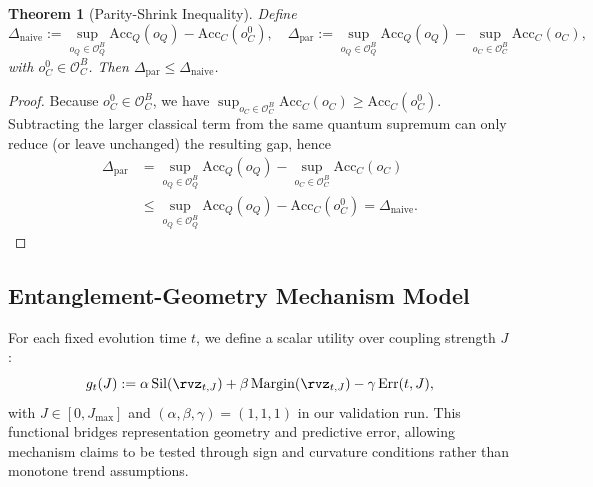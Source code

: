 \documentclass{article} %
\newtheorem{theorem}{Theorem}[section]
\begin{document}
\begin{theorem}[Parity-Shrink Inequality]
\label{thm:parity_shrink}
Define
\begin{equation}
\Delta_{\mathrm{naive}}:=\sup_{o_Q\in\mathcal{O}_Q^B} \mathrm{Acc}_Q(o_Q)-\mathrm{Acc}_C(o_C^0),\quad
\Delta_{\mathrm{par}}:=\sup_{o_Q\in\mathcal{O}_Q^B} \mathrm{Acc}_Q(o_Q)-\sup_{o_C\in\mathcal{O}_C^B}\mathrm{Acc}_C(o_C),
\label{eq:delta_defs}
\end{equation}
with $o_C^0\in\mathcal{O}_C^B$. Then $\Delta_{\mathrm{par}}\le\Delta_{\mathrm{naive}}$.
\end{theorem}
\begin{proof}
Because $o_C^0\in\mathcal{O}_C^B$, we have
$\sup_{o_C\in\mathcal{O}_C^B}\mathrm{Acc}_C(o_C)\ge\mathrm{Acc}_C(o_C^0)$.
Subtracting the larger classical term from the same quantum supremum can only reduce (or leave unchanged) the resulting gap, hence
\begin{align*}
\Delta_{\mathrm{par}}
&=\sup_{o_Q\in\mathcal{O}_Q^B}\mathrm{Acc}_Q(o_Q)-\sup_{o_C\in\mathcal{O}_C^B}\mathrm{Acc}_C(o_C)\\
&\le\sup_{o_Q\in\mathcal{O}_Q^B}\mathrm{Acc}_Q(o_Q)-\mathrm{Acc}_C(o_C^0)
=\Delta_{\mathrm{naive}}.
\end{align*}
\end{proof}

\subsection{Entanglement-Geometry Mechanism Model}
For each fixed evolution time $t$, we define a scalar utility over coupling strength $J$:
\begin{equation}
g_t(J) := \alpha\,\mathrm{Sil}(\rvz_{t,J}) + \beta\,\mathrm{Margin}(\rvz_{t,J}) - \gamma\,\mathrm{Err}(t,J),
\label{eq:gtj}
\end{equation}
with $J\in[0,J_{\max}]$ and $(\alpha,\beta,\gamma)=(1,1,1)$ in our validation run.
This functional bridges representation geometry and predictive error, allowing mechanism claims to be tested through sign and curvature conditions rather than monotone trend assumptions.
\end{document}
